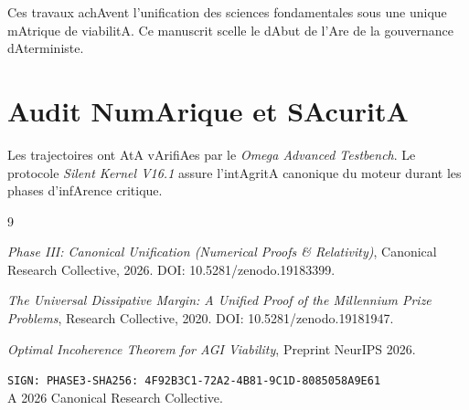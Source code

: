 ﻿\documentclass[11pt,a4paper]{amsart}
\begin{document}
Ces travaux achAvent l'unification des sciences fondamentales sous une unique mAtrique de viabilitA. Ce manuscrit scelle le dAbut de l'Are de la gouvernance dAterministe.



\appendix

\section{Audit NumArique et SAcuritA}

Les trajectoires ont AtA vArifiAes par le \emph{Omega Advanced Testbench}. Le protocole \emph{Silent Kernel V16.1} assure l'intAgritA canonique du moteur durant les phases d'infArence critique.



\begin{thebibliography}{9}

 \emph{Phase III: Canonical Unification (Numerical Proofs \& Relativity)}, Canonical Research Collective, 2026. DOI: 10.5281/zenodo.19183399.

 \emph{The Universal Dissipative Margin: A Unified Proof of the Millennium Prize Problems}, Research Collective, 2020. DOI: 10.5281/zenodo.19181947.

 \emph{Optimal Incoherence Theorem for AGI Viability}, Preprint NeurIPS 2026.

\end{thebibliography}



\bigskip

\noindent\texttt{SIGN: PHASE3-SHA256: 4F92B3C1-72A2-4B81-9C1D-8085058A9E61} \\

A 2026 Canonical Research Collective.
\end{document}
